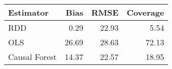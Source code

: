 \begin{table}[ht]
\centering
\begin{tabular}{lrrr}
  \hline
Estimator & Bias & RMSE & Coverage \\ 
  \hline
RDD & 0.29 & 22.93 & 5.54 \\ 
  OLS & 26.69 & 28.63 & 72.13 \\ 
  Causal Forest & 14.37 & 22.57 & 18.95 \\ 
   \hline
\end{tabular}
\end{table}

